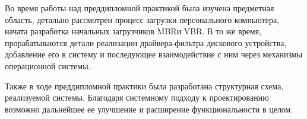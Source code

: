 \label{sec:intro}

Во время работы над преддипломной практикой была изучена предметная область, детально рассмотрен процесс загрузки персонального компьютера, начата разработка начальных загрузчиков MBRи VBR\@. В то же время, прорабатываются детали реализации драйвера-фильтра дискового устройства, добавление его в систему и последующее взаимодействие с ним через механизмы операционной системы.

Также в ходе преддипломной практики была разработана структурная схема, реализуемой системы. Благодаря системному подходу к проектированию возможно дальнейшее ее улучшение и расширение функциональности в целом.
